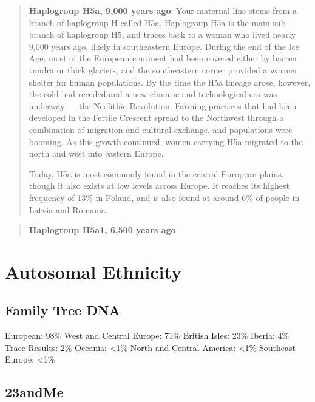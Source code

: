 \documentclass[11pt,letter]{book}
\begin{document}
\begin{quote}
\textbf{Haplogroup H5a, 9,000 years ago}:  Your maternal line stems from a branch of haplogroup H called H5a. Haplogroup H5a is the main sub-branch of haplogroup H5, and traces back to a woman who lived nearly 9,000 years ago, likely in southeastern Europe. During the end of the Ice Age, most of the European continent had been covered either by barren tundra or thick glaciers, and the southeastern corner provided a warmer shelter for human populations. By the time the H5a lineage arose, however, the cold had receded and a new climatic and technological era was underway — the Neolithic Revolution. Farming practices that had been developed in the Fertile Crescent spread to the Northwest through a combination of migration and cultural exchange, and populations were booming. As this growth continued, women carrying H5a migrated to the north and west into eastern Europe.

Today, H5a is most commonly found in the central European plains, though it also exists at low levels across Europe. It reaches its highest frequency of 13\% in Poland, and is also found at around 6\% of people in Latvia and Romania.
\end{quote}

\begin{quote}
\textbf{Haplogroup H5a1, 6,500 years ago}
\end{quote}

\section{Autosomal Ethnicity}

\subsection{Family Tree DNA}

\begin{outline}
  \1 European: 98\%
    \2 [\textbullet] West and Central Europe: 71\%
    \2 [\textbullet] British Isles: 23\%
    \2 [\textbullet] Iberia: 4\%
  \1 Trace Results: 2\%
    \2 [$\circ$] Oceania: <1\%
    \2 [$\circ$] North and Central America: <1\%
    \2 [$\circ$] Southeast Europe: <1\%
\end{outline}

\subsection{23andMe}
\end{document}
